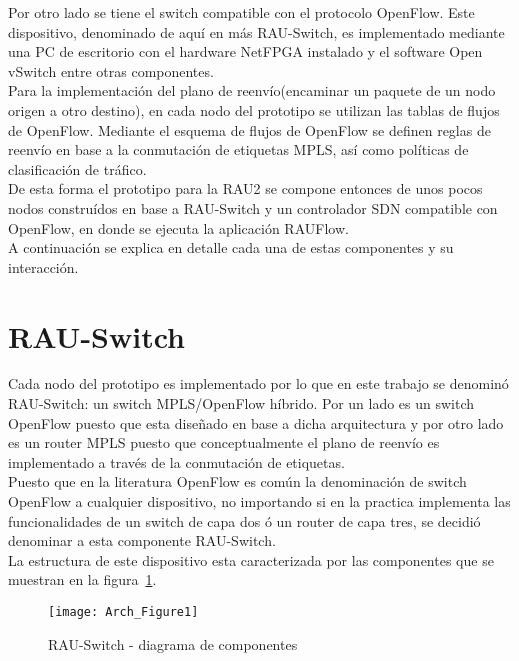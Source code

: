 Por otro lado se tiene el switch compatible con el protocolo OpenFlow. Este dispositivo, denominado de aqu\'i en m\'as RAU-Switch, es implementado mediante una PC de escritorio con el hardware NetFPGA instalado y el software Open vSwitch entre otras componentes.\\ 

Para la implementaci\'on del plano de reenvío(encaminar un paquete de un nodo origen a otro destino), en cada nodo del prototipo se utilizan las tablas de flujos de OpenFlow. Mediante el esquema de flujos de OpenFlow se definen reglas de reenv\'io en base a la conmutaci\'on de etiquetas MPLS, as\'i como pol\'iticas de clasificaci\'on de tr\'afico.\\

De esta forma el prototipo para la RAU2 se compone entonces de unos pocos nodos constru\'idos en base a RAU-Switch y un controlador SDN compatible con OpenFlow, en donde se ejecuta la aplicaci\'on RAUFlow.\\

A continuaci\'on se explica en detalle cada una de estas componentes y su interacci\'on.

\section{RAU-Switch}
Cada nodo del prototipo es implementado por lo que en este trabajo se denomin\'o RAU-Switch: un switch MPLS/OpenFlow híbrido. Por un lado es un switch OpenFlow puesto que esta dise\~nado en base a dicha arquitectura y por otro lado es un router MPLS puesto que conceptualmente el plano de reenvío es implementado a trav\'es de la conmutación de etiquetas.\\

Puesto que en la literatura OpenFlow es común la denominación de switch OpenFlow a cualquier dispositivo, no importando si en la practica implementa las funcionalidades de un switch de capa dos \'o un router de capa tres, se decidió denominar a esta componente RAU-Switch.\\

La estructura de este dispositivo esta caracterizada por las componentes que se muestran en la figura~\ref{fig:OpenSourceRArch}.

\begin{figure}[htbp!] 
\centering    
\texttt{[image: Arch\_Figure1]}
\caption[RAU-Switch - diagrama de componentes]{RAU-Switch - diagrama de componentes}
\label{fig:OpenSourceRArch}
\end{figure}

